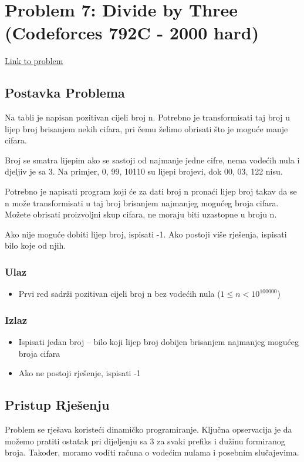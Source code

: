 \section{Problem 7: Divide by Three (Codeforces 792C - 2000 hard)}
\href{https://codeforces.com/problemset/problem/792/C}{Link to problem}

\subsection{Postavka Problema}
Na tabli je napisan pozitivan cijeli broj n. Potrebno je transformisati taj broj u lijep broj brisanjem nekih cifara, pri čemu želimo obrisati što je moguće manje cifara.

Broj se smatra lijepim ako se sastoji od najmanje jedne cifre, nema vodećih nula i djeljiv je sa 3. Na primjer, 0, 99, 10110 su lijepi brojevi, dok 00, 03, 122 nisu.

Potrebno je napisati program koji će za dati broj n pronaći lijep broj takav da se n može transformisati u taj broj brisanjem najmanjeg mogućeg broja cifara. Možete obrisati proizvoljni skup cifara, ne moraju biti uzastopne u broju n.

Ako nije moguće dobiti lijep broj, ispisati -1. Ako postoji više rješenja, ispisati bilo koje od njih.

\subsubsection{Ulaz}
\begin{itemize}
    \item Prvi red sadrži pozitivan cijeli broj n bez vodećih nula ($1 \leq n < 10^{100000}$)
\end{itemize}

\subsubsection{Izlaz}
\begin{itemize}
    \item Ispisati jedan broj -- bilo koji lijep broj dobijen brisanjem najmanjeg mogućeg broja cifara
    \item Ako ne postoji rješenje, ispisati -1
\end{itemize}

\subsection{Pristup Rješenju}
Problem se rješava koristeći dinamičko programiranje. Ključna opservacija je da možemo pratiti ostatak pri dijeljenju sa 3 za svaki prefiks i dužinu formiranog broja. Također, moramo voditi računa o vodećim nulama i posebnim slučajevima.

